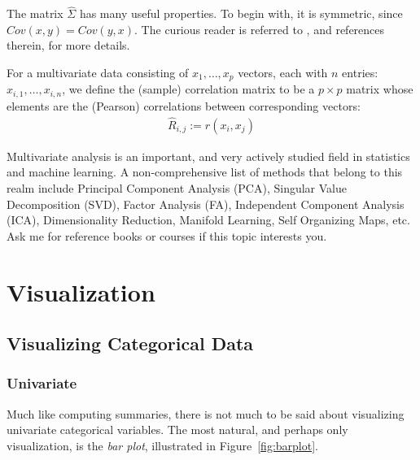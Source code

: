 \begin{extra}
The matrix $\hat{\Sigma}$ has many useful properties. 
To begin with, it is symmetric, since $Cov(x,y)=Cov(y,x)$.
The curious reader is referred to \cite{petersen_matrix_2006}, and references therein, for more details.
\end{extra}

\begin{definition}
For a multivariate data consisting of $x_1,\dots,x_p$ vectors, each with $n$ entries: $x_{i,1},\dots,x_{i,n}$, we define the (sample) correlation matrix to be a $p\times p$ matrix whose elements are the (Pearson) correlations between corresponding vectors:
\begin{align}
	\hat{R}_{i,j}:= r(x_i, x_j)
\end{align}
\end{definition}


\begin{extra}
Multivariate analysis is an important, and very actively studied field in statistics and machine learning.
A non-comprehensive list of methods that belong to this realm include 
Principal Component Analysis (PCA),
Singular Value Decomposition (SVD), 
Factor Analysis (FA), 
Independent Component Analysis (ICA),
Dimensionality Reduction, 
Manifold Learning, 
Self Organizing Maps, 
etc.
Ask me for reference books or courses if this topic interests you.
\end{extra}

\afterpage{\clearpage}


\section{Visualization}
\label{sec:visualizations}

\subsection{Visualizing Categorical Data}



\subsubsection{Univariate}
Much like computing summaries, there is not much to be said about visualizing univariate categorical variables. 
The most natural, and perhaps only visualization, is the \emph{bar plot}, illustrated in Figure~\ref{fig:barplot}.



